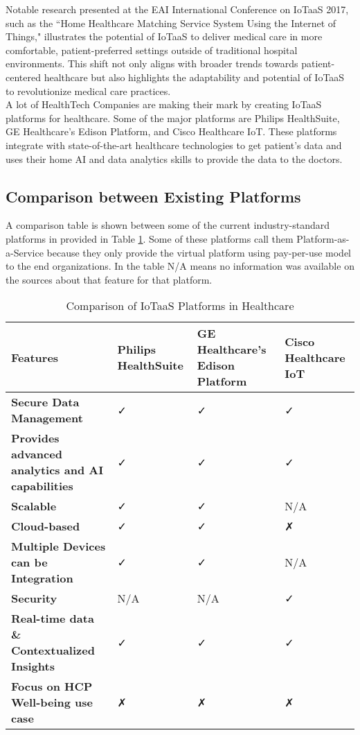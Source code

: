 \noindent Notable research presented at the EAI International Conference on IoTaaS 2017, such as the ``Home Healthcare Matching Service System Using the Internet of Things," illustrates the potential of IoTaaS to deliver medical care in more comfortable, patient-preferred settings outside of traditional hospital environments.\cite{44} This shift not only aligns with broader trends towards patient-centered healthcare but also highlights the adaptability and potential of IoTaaS to revolutionize medical care practices. \\

\noindent A lot of HealthTech Companies are making their mark by creating IoTaaS platforms for healthcare. Some of the major platforms are Philips HealthSuite, GE Healthcare's Edison Platform, and Cisco Healthcare IoT. These platforms integrate with state-of-the-art healthcare technologies to get patient's data and uses their home AI and data analytics skills to provide the data to the doctors. \\

\subsection{Comparison between Existing Platforms}

\noindent A comparison table is shown between some of the current industry-standard platforms in provided in Table \ref{tab:iot-comparison}. Some of these platforms call them Platform-as-a-Service because they only provide the virtual platform using pay-per-use model to the end organizations. In the table N/A means no information was available on the sources about that feature for that platform. 


\begin{table}[ht]
\centering
\begin{tabularx}{\textwidth}{|l|X|X|X|}
\hline
\textbf{Features} & \textbf{Philips HealthSuite} & \textbf{GE Healthcare's Edison Platform} & \textbf{Cisco Healthcare IoT} \\ \hline
\textbf{Secure Data Management} &  ✓ &  ✓ &  ✓ \\ \hline
\textbf{Provides advanced analytics and AI capabilities} &  ✓ &  ✓ &  ✓ \\ \hline
\textbf{Scalable} & ✓ & ✓ & N/A \\ \hline
\textbf{Cloud-based} &  ✓ &  ✓ & ✗ \\ \hline
\textbf{Multiple Devices can be Integration} & ✓ & ✓ & N/A \\ \hline
\textbf{Security} & N/A & N/A & ✓ \\ \hline
\textbf{Real-time data \& Contextualized Insights} & ✓ & ✓ & ✓ \\ \hline
\textbf{Focus on HCP Well-being use case} & ✗ & ✗ & ✗ \\ \hline
\end{tabularx}
\caption{Comparison of IoTaaS Platforms in Healthcare}
\label{tab:iot-comparison}
\end{table}

